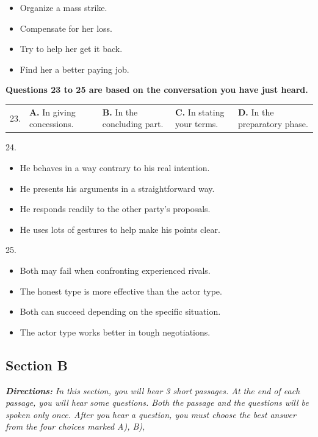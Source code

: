 \documentclass[UTF8,11pt]{ctexart}
\begin{document}
\begin{itemize}[leftmargin=2em,itemsep=.2em,topsep=.4em]\item[A.] Organize a mass strike.
\item[B.] Compensate for her loss.
\item[C.] Try to help her get it back.
\item[D.] Find her a better paying job.
\end{itemize}

\textbf{Questions 23 to 25 are based on the conversation you have just heard.}


\noindent\begin{tabularx}{\linewidth}{@{}lXXXX@{}}23. & \textbf{A.} In giving concessions. & \textbf{B.} In the concluding part. & \textbf{C.} In stating your terms. & \textbf{D.} In the preparatory phase.\\\end{tabularx}\par

24.


\begin{itemize}[leftmargin=2em,itemsep=.2em,topsep=.4em]\item[A.] He behaves in a way contrary to his real intention.
\item[B.] He presents his arguments in a straightforward way.
\item[C.] He responds readily to the other party's proposals.
\item[D.] He uses lots of gestures to help make his points clear.
\end{itemize}

25.


\begin{itemize}[leftmargin=2em,itemsep=.2em,topsep=.4em]\item[A.] Both may fail when confronting experienced rivals.
\item[B.] The honest type is more effective than the actor type.
\item[C.] Both can succeed depending on the specific situation.
\item[D.] The actor type works better in tough negotiations.
\end{itemize}

\subsection*{\textbf{Section B}}


\textbf{\textit{Directions:}}\textit{ In this section, you will hear 3 short passages. At the end of each passage, you will hear} \textit{some questions. Both the passage and the questions will be spoken only once. After you} \textit{hear a question, you must choose the best answer from the four choices marked A), B),}
\end{document}
